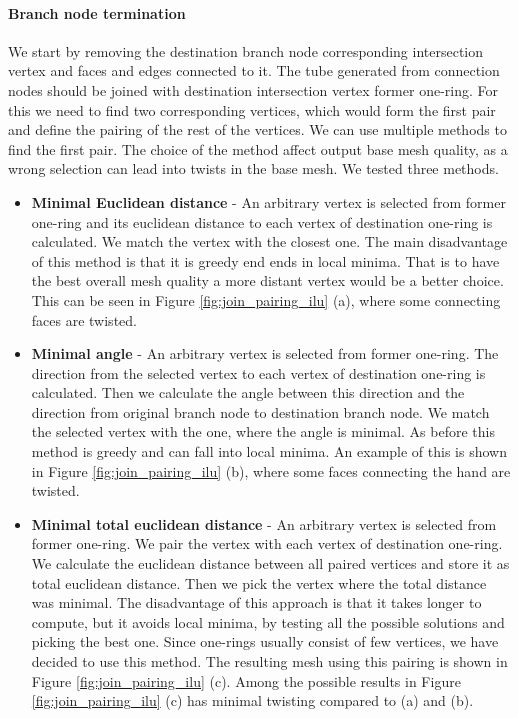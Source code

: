\paragraph{Branch node termination}
We start by removing the destination branch node corresponding intersection vertex and faces and edges connected to it. The tube generated from connection nodes should be joined with destination intersection vertex former one-ring. For this we need to find two corresponding vertices, which would form the first pair and define the pairing of the rest of the vertices. We can use multiple methods to find the first pair. The choice of the method affect output base mesh quality, as a wrong selection can lead into twists in the base mesh. We tested three methods.
\begin{itemize}
	\itemsep-0.25em 
	\item \textbf{Minimal Euclidean distance} - An arbitrary vertex is selected from former one-ring and its euclidean distance to each vertex of destination one-ring is calculated. We match the vertex with the closest one. The main disadvantage of this method is that it is greedy end ends in local minima. That is to have the best overall mesh quality a more distant vertex would be a better choice. This can be seen in Figure \ref{fig:join_pairing_ilu} (a), where some connecting faces are twisted.
	\item \textbf{Minimal angle} - An arbitrary vertex is selected from former one-ring. The direction from the selected vertex to each vertex of destination one-ring is calculated. Then we calculate the angle between this direction and the direction from original branch node to destination branch node. We match the selected vertex with the one, where the angle is minimal. As before this method is greedy and can fall into local minima. An example of this is shown in Figure \ref{fig:join_pairing_ilu} (b), where some faces connecting the hand are twisted.
	\item \textbf{Minimal total euclidean distance} - An arbitrary vertex is selected from former one-ring. We pair the vertex with each vertex of destination one-ring. We calculate the euclidean distance between all paired vertices and store it as total euclidean distance. Then we pick the vertex where the total distance was minimal. The disadvantage of this approach is that it takes longer to compute, but it avoids local minima, by testing all the possible solutions and picking the best one. Since one-rings usually consist of few vertices, we have decided to use this method. The resulting mesh using this pairing is shown in Figure \ref{fig:join_pairing_ilu} (c). Among the possible results in Figure \ref{fig:join_pairing_ilu} (c) has minimal twisting compared to (a) and (b). 
\end{itemize}

